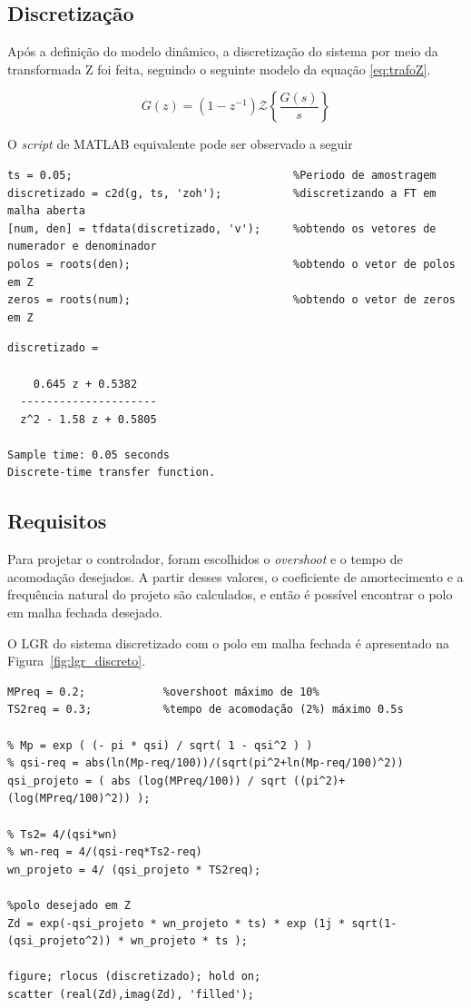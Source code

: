 \documentclass{article}
\begin{document}
\subsection{Discretização}

Após a definição do modelo dinâmico, a discretização do sistema por meio da transformada Z foi feita, seguindo o seguinte modelo da equação \ref{eq:trafoZ}.

\begin{equation}
    G(z) = (1-z^{-1}) \mathscr{Z}\left\{\frac{G(s)}{s}\right\}
    \label{eq:trafoZ}
\end{equation}

O \textit{script} de MATLAB equivalente pode ser observado a seguir

\begin{lstlisting}
ts = 0.05;                                  %Periodo de amostragem
discretizado = c2d(g, ts, 'zoh');           %discretizando a FT em malha aberta
[num, den] = tfdata(discretizado, 'v');     %obtendo os vetores de numerador e denominador
polos = roots(den);                         %obtendo o vetor de polos em Z
zeros = roots(num);                         %obtendo o vetor de zeros em Z
\end{lstlisting}

\color{gray} \begin{verbatim}
discretizado =
 
    0.645 z + 0.5382
  ---------------------
  z^2 - 1.58 z + 0.5805
 
Sample time: 0.05 seconds
Discrete-time transfer function.
\end{verbatim} \color{black}

\subsection{Requisitos}
{
    Para projetar o controlador, foram escolhidos o \textit{overshoot} e o tempo de acomodação desejados. A partir desses valores, o coeficiente de amortecimento e a frequência natural do projeto são calculados, e então é possível encontrar o polo em malha fechada desejado.
    
    O LGR do sistema discretizado com o polo em malha fechada é apresentado na Figura~\ref{fig:lgr_discreto}.
}

\begin{lstlisting}
MPreq = 0.2;            %overshoot máximo de 10%
TS2req = 0.3;           %tempo de acomodação (2%) máximo 0.5s

% Mp = exp ( (- pi * qsi) / sqrt( 1 - qsi^2 ) )
% qsi-req = abs(ln(Mp-req/100))/(sqrt(pi^2+ln(Mp-req/100)^2))
qsi_projeto = ( abs (log(MPreq/100)) / sqrt ((pi^2)+(log(MPreq/100)^2)) );

% Ts2= 4/(qsi*wn)
% wn-req = 4/(qsi-req*Ts2-req)
wn_projeto = 4/ (qsi_projeto * TS2req);

%polo desejado em Z
Zd = exp(-qsi_projeto * wn_projeto * ts) * exp (1j * sqrt(1-(qsi_projeto^2)) * wn_projeto * ts );

figure; rlocus (discretizado); hold on;
scatter (real(Zd),imag(Zd), 'filled');
\end{lstlisting}
\end{document}
